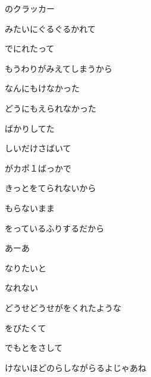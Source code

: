 \documentclass[a4paper,tate,twocolumn,12pt]{ltjtarticle}
\begin{document}
\thispagestyle{empty}

\begin{center}
{\LARGE {}のクラッカー}
\end{center}

\vspace{1em}

\begin{flushleft}

\noindent\begin{minipage}{\linewidth}
みたいにぐるぐるかれて

でにれたって

もうわりがみえてしまうから

なんにもけなかった

どうにもえられなかった

ばかりしてた
\end{minipage}

\vspace{2em}

\noindent\begin{minipage}{\linewidth}
しいだけさばいて

がカポ１ばっかで

きっとをてられないから

もらないまま

をっているふりするだから

あーあ
\end{minipage}

\vspace{2em}

\noindent\begin{minipage}{\linewidth}
なりたいと

なれない

どうせどうせがをくれたような

をびたくて

でもとをさして

けないほどのらしながらるよじゃあね
\end{minipage}


\end{flushleft}
\end{document}
